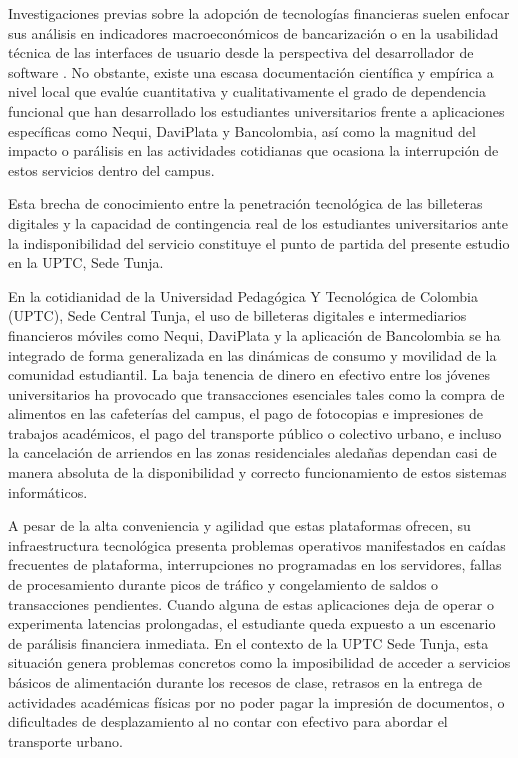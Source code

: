 Investigaciones previas sobre la adopción de tecnologías financieras suelen enfocar sus análisis en indicadores macroeconómicos de bancarización o en la usabilidad técnica de las interfaces de usuario desde la perspectiva del desarrollador de software \cite{silva2022evaluacion}. No obstante, existe una escasa documentación científica y empírica a nivel local que evalúe cuantitativa y cualitativamente el grado de dependencia funcional que han desarrollado los estudiantes universitarios frente a aplicaciones específicas como Nequi, DaviPlata y Bancolombia, así como la magnitud del impacto o parálisis en las actividades cotidianas que ocasiona la interrupción de estos servicios dentro del campus.

Esta brecha de conocimiento entre la penetración tecnológica de las billeteras digitales y la capacidad de contingencia real de los estudiantes universitarios ante la indisponibilidad del servicio constituye el punto de partida del presente estudio en la UPTC, Sede Tunja.

\vspace{1em}

\hypertarget{sec:descripcion}{}%
\par
En la cotidianidad de la Universidad Pedagógica Y Tecnológica de Colombia (UPTC), Sede Central Tunja, el uso de billeteras digitales e intermediarios financieros móviles como Nequi, DaviPlata y la aplicación de Bancolombia se ha integrado de forma generalizada en las dinámicas de consumo y movilidad de la comunidad estudiantil. La baja tenencia de dinero en efectivo entre los jóvenes universitarios ha provocado que transacciones esenciales tales como la compra de alimentos en las cafeterías del campus, el pago de fotocopias e impresiones de trabajos académicos, el pago del transporte público o colectivo urbano, e incluso la cancelación de arriendos en las zonas residenciales aledañas dependan casi de manera absoluta de la disponibilidad y correcto funcionamiento de estos sistemas informáticos.

A pesar de la alta conveniencia y agilidad que estas plataformas ofrecen, su infraestructura tecnológica presenta problemas operativos manifestados en caídas frecuentes de plataforma, interrupciones no programadas en los servidores, fallas de procesamiento durante picos de tráfico y congelamiento de saldos o transacciones pendientes. Cuando alguna de estas aplicaciones deja de operar o experimenta latencias prolongadas, el estudiante queda expuesto a un escenario de parálisis financiera inmediata. En el contexto de la UPTC Sede Tunja, esta situación genera problemas concretos como la imposibilidad de acceder a servicios básicos de alimentación durante los recesos de clase, retrasos en la entrega de actividades académicas físicas por no poder pagar la impresión de documentos, o dificultades de desplazamiento al no contar con efectivo para abordar el transporte urbano.


